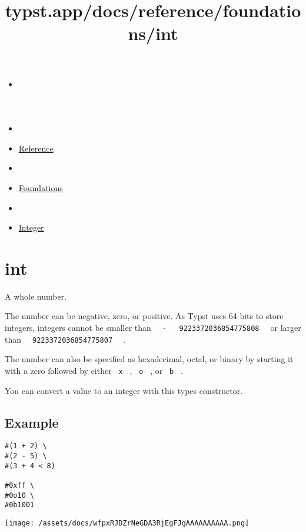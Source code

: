 \title{typst.app/docs/reference/foundations/int}

\begin{itemize}
\tightlist
\item
  \href{/docs}{}
\item
  
\item
  \href{/docs/reference/}{Reference}
\item
  
\item
  \href{/docs/reference/foundations/}{Foundations}
\item
  
\item
  \href{/docs/reference/foundations/int/}{Integer}
\end{itemize}

\section{\texorpdfstring{{ int }}{ int }}\label{summary}

A whole number.

The number can be negative, zero, or positive. As Typst uses 64 bits to
store integers, integers cannot be smaller than
\texttt{\ }{\texttt{\ -\ }}\texttt{\ }{\texttt{\ 9223372036854775808\ }}\texttt{\ }
or larger than \texttt{\ }{\texttt{\ 9223372036854775807\ }}\texttt{\ }
.

The number can also be specified as hexadecimal, octal, or binary by
starting it with a zero followed by either \texttt{\ x\ } ,
\texttt{\ o\ } , or \texttt{\ b\ } .

You can convert a value to an integer with this type\textquotesingle s
constructor.

\subsection{Example}\label{example}

\begin{verbatim}
#(1 + 2) \
#(2 - 5) \
#(3 + 4 < 8)

#0xff \
#0o10 \
#0b1001
\end{verbatim}

\texttt{[image: /assets/docs/wfpxRJDZrNeGDA3RjEgFJgAAAAAAAAAA.png]}

